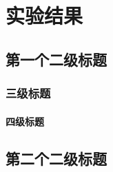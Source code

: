 \chapter{实验结果}
    \section{第一个二级标题}
        \subsection{三级标题}
            \subsubsection{四级标题}
    \section{第二个二级标题}